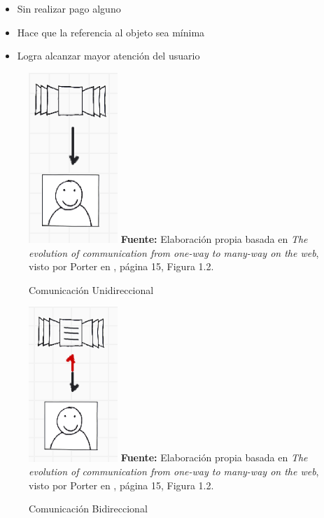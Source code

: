 \documentclass[oneside,12pt,a4paper]{memoir}%
\begin{document}
		\begin{itemize}
		  \item Sin realizar pago alguno
		  \item Hace que la referencia al objeto sea m\'inima
		  \item Logra alcanzar mayor atenci\'on del usuario 
		\end{itemize}
		
		\begin{figure}[here]
			\centering
			\caption{Comunicaci\'on Unidireccional}
			\includegraphics[width=0.3\textwidth]{figure/fig_onewayCommunication.PNG}
			\newline
			\textbf{Fuente:} Elaboraci\'on propia basada en \textit{The evolution of
			communication from one-way to many-way on the web}, visto por Porter en
			\cite{Porter2008}, p\'agina 15, Figura 1.2.
			\label{fig:oneWayCommunication}
		\end{figure}
		
		\begin{figure}[here]
			\centering
			\caption{Comunicaci\'on Bidireccional}
			\includegraphics[width=0.3\textwidth]{figure/fig_twowayCommunication.PNG}
			\newline
			\textbf{Fuente:} Elaboraci\'on propia basada en \textit{The evolution of
			communication from one-way to many-way on the web}, visto por Porter en
			\cite{Porter2008}, p\'agina 15, Figura 1.2.
			\label{fig:twoWayCommunication}
		\end{figure}
		
\end{document}
